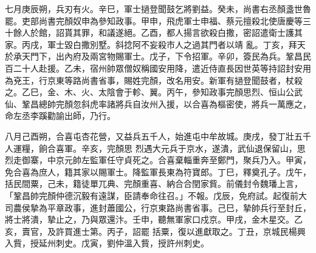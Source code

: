 \begin{pinyinscope}
 七月庚辰朔，兵刃有火。辛巳，軍士撾登聞鼓乞將劉益。癸未，尚書右丞顏盞世魯罷。吏部尚書完顏奴申為參知政事。甲申，飛虎軍士申福、蔡元擅殺北使唐慶等三十餘人於館，詔貰其罪，和議遂絕。乙酉，都人揚言欲殺白撒，密詔遣衛士護其家。丙戌，軍士毀白撒別墅。斜捻阿不妄殺市人之過其門者以靖
 亂。丁亥，拜天於承天門下，出內府及兩宮物賜軍士。戊子，下令招軍。辛卯，簽民為兵。鞏昌民百二十人赴援。乙未，宿州帥眾僧奴稱國安用降，遣近侍直長因世英等持詔封安用為兗王，行京東等路尚書省事，賜姓完顏，改名用安。新軍有撾登聞鼓者，杖殺之。乙巳，金、木、火、太陰會于軫、翼。丙午，參知政事完顏思烈、恒山公武仙、鞏昌總帥完顏忽斜虎率諸將兵自汝州入援，以合喜為樞密使，將兵一萬應之，命左丞李蹊勸諭出師，乃行。



 八月己酉朔，合喜屯杏花營，又益兵五千人，始進屯中牟故城。庚戌，發丁壯五千人運糧，餉合喜軍。辛亥，完顏思
 烈遇大元兵于京水，遂潰，武仙退保留山，思烈走御寨，中京元帥左監軍任守貞死之。合喜棄輜重奔至鄭門，聚兵乃入。甲寅，免合喜為庶人，籍其家以賜軍士。降監軍長東為符寶郎。丁巳，釋奠孔子。戊午，括民間粟，己未，籍徒單兀典、完顏重喜、納合合閏家貲。前儀封令魏璠上言，「鞏昌帥完顏仲德沉毅有遠謀，臣請奉命往召。」不報。戊辰，免府試。起復前大司農侯摯為平章政事，進封蕭國公，行京東路尚書省事。己巳，摯帥兵行至封丘，將士將潰，摯止之，乃與眾還汴。壬申，聽無軍家口戍京。甲戌，金木星交。乙亥，賣官，及許買進士第。丙子，詔罷
 括粟，復以進獻取之。丁丑，京城民楊興入貲，授延州刺史。戊寅，劉仲溫入貲，授許州刺史。



\end{pinyinscope}